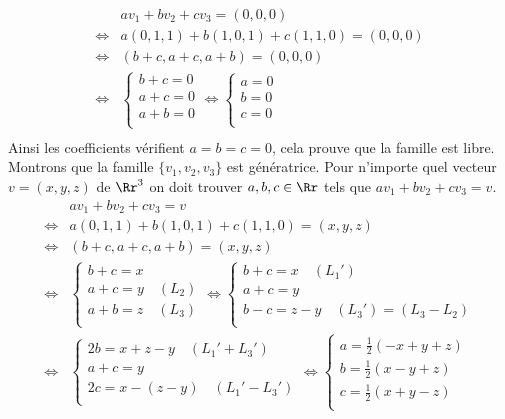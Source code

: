 {\begin{enumerate}
{\begin{enumerate}
\begin{align*}
  &  a v_1+b v_2 + c v_3 = (0,0,0) \\
\iff & a (0,1,1) + b(1,0,1) + c(1,1,0) = (0,0,0) \\
\iff & (b+c,a+c,a+b)=(0,0,0) \\
\iff & \begin{cases}
       b+c = 0 \\
       a+c = 0 \\
       a+b = 0  \\
       \end{cases} 
\iff \begin{cases}
       a = 0 \\
       b = 0 \\
       c = 0  \\
       \end{cases} \\
\end{align*}
Ainsi les coefficients vérifient $a=b=c=0$, cela prouve que la famille est libre.
Montrons que la famille $\{ v_1, v_2, v_3\}$ est génératrice. Pour n'importe quel
vecteur $v=(x,y,z)$ de $\Rr^3$ on doit trouver $a,b,c\in\Rr$ tels que $a v_1+b v_2 + c v_3 = v$.
\begin{align*}
  &  a v_1+b v_2 + c v_3 = v \\
\iff & a (0,1,1) + b(1,0,1) + c(1,1,0) = (x,y,z) \\
\iff & (b+c,a+c,a+b)=(x,y,z) \\
\iff & \begin{cases}
       b+c = x \\
       a+c = y \quad (L_2) \\
       a+b = z \quad (L_3) \\
       \end{cases} 
\iff  \begin{cases}
       b+c = x \quad (L_1')\\
       a+c = y \\
       b-c = z-y  \quad(L_3')=(L_3-L_2)\\
       \end{cases} \\
\iff & \begin{cases}
       2b = x+z-y \quad (L_1'+L_3') \\
       a+c = y \\
       2c = x-(z-y) \quad  (L_1'-L_3')  \\
       \end{cases} 
\iff  \begin{cases}
       a = \frac12 (-x+y+z) \\
       b = \frac12 (x-y+z) \\
       c = \frac12 (x+y-z) \\
       \end{cases} \\
\end{align*}



\end{enumerate}}
\end{enumerate}}
